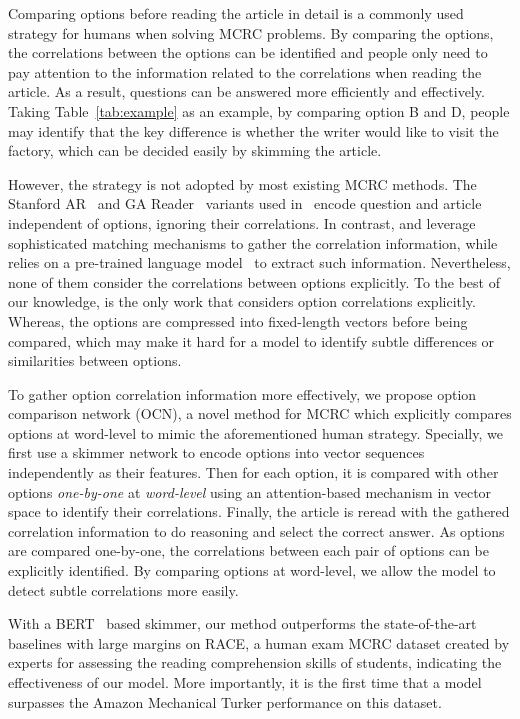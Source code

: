 \documentclass[11pt,a4paper]{article}
\begin{document}
Comparing options before reading the article in detail is a commonly used strategy for humans when solving MCRC problems. By comparing the options, the correlations between the options can be identified and people only need to pay attention to the information related to the correlations when reading the article. As a result, questions can be answered more efficiently and effectively. Taking Table~\ref{tab:example} as an example, by comparing option B and D, people may identify that the key difference is whether the writer would like to visit the factory, which can be decided easily by skimming the article.

However, the strategy is not adopted by most existing MCRC methods.
The Stanford AR~\cite{StanfordAR} and GA Reader~\cite{GAReader} variants used in~\cite{RACE} encode question and article independent of options, ignoring their correlations.
In contrast,  and  leverage sophisticated matching mechanisms to gather the correlation information, while  relies on a pre-trained language model~\cite{OpenAIGPT} to extract such information. 
Nevertheless, none of them consider the correlations between options explicitly.
To the best of our knowledge, \cite{HAF} is the only work that considers option correlations explicitly. Whereas, the options are compressed into fixed-length vectors before being compared, which may make it hard for a model to identify subtle differences or similarities between options.

To gather option correlation information more effectively, we propose option comparison network (OCN), a novel method for MCRC which explicitly compares options at word-level to mimic the aforementioned human strategy. Specially, we first use a skimmer network to encode options into vector sequences independently as their features. Then for each option, it is compared with other options {\em one-by-one} at {\em word-level} using an attention-based mechanism in vector space to identify their correlations. Finally, the article is reread with the gathered correlation information to do reasoning and select the correct answer.
As options are compared one-by-one, the correlations between each pair of options can be explicitly identified. By comparing options at word-level, we allow the model to detect subtle correlations more easily.

With a BERT~\cite{BERT} based skimmer, our method outperforms the state-of-the-art baselines with large margins on RACE, a human exam MCRC dataset created by experts for assessing the reading comprehension skills of students, indicating the effectiveness of our model. More importantly, it is the first time that a model surpasses the Amazon Mechanical Turker performance on this dataset.
\end{document}
